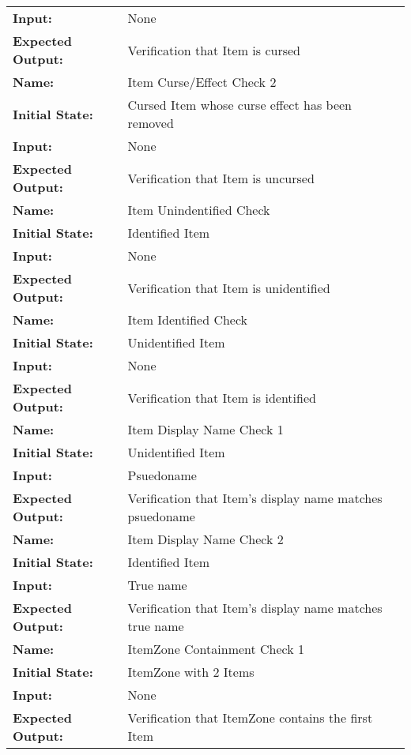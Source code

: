 \documentclass[12pt, titlepage]{article}
\begin{document}
\begin{center}
\begin{longtable}{ l | p{10cm} }
				\textbf{Input:} & None\\
				\textbf{Expected Output:} & Verification that Item is cursed\\[0.6em]
				\hline
				\rule{0pt}{1.5em}\textbf{Name:} & Item Curse/Effect Check 2\\
				\textbf{Initial State:} & Cursed Item whose curse effect has been removed\\
				\textbf{Input:} & None\\
				\textbf{Expected Output:} & Verification that Item is uncursed\\[0.6em]
				\hline
				\rule{0pt}{1.5em}\textbf{Name:} & Item Unindentified Check\\
				\textbf{Initial State:} & Identified Item\\
				\textbf{Input:} & None\\
				\textbf{Expected Output:} & Verification that Item is unidentified\\[0.6em]
				\hline
				\rule{0pt}{1.5em}\textbf{Name:} & Item Identified Check\\
				\textbf{Initial State:} & Unidentified Item\\
				\textbf{Input:} & None\\
				\textbf{Expected Output:} & Verification that Item is identified\\[0.6em]
				\hline
				\rule{0pt}{1.5em}\textbf{Name:} & Item Display Name Check 1\\
				\textbf{Initial State:} & Unidentified Item\\
				\textbf{Input:} & Psuedoname\\
				\textbf{Expected Output:} & Verification that Item's display name matches psuedoname\\[0.6em]
				\hline
				\rule{0pt}{1.5em}\textbf{Name:} & Item Display Name Check 2\\
				\textbf{Initial State:} & Identified Item\\
				\textbf{Input:} & True name\\
				\textbf{Expected Output:} & Verification that Item's display name matches true name\\[0.6em]
				\hline
				\rule{0pt}{1.5em}\textbf{Name:} & ItemZone Containment Check 1\\
				\textbf{Initial State:} & ItemZone with 2 Items\\
				\textbf{Input:} & None\\
				\textbf{Expected Output:} & Verification that ItemZone contains the first Item\\[0.6em]

\end{longtable}
\end{center}
\end{document}
